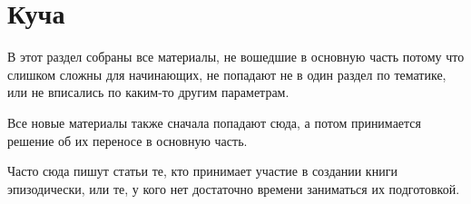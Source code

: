 \part{Куча}

В этот раздел собраны все материалы, не вошедшие в основную часть потому что
слишком сложны для начинающих, не попадают не в один раздел по тематике, или
не вписались по каким-то другим параметрам.

Все новые материалы также сначала попадают сюда, а потом принимается решение об
их переносе в основную часть.

Часто сюда пишут статьи те, кто принимает участие в создании книги эпизодически,
или те, у кого нет достаточно времени заниматься их подготовкой.


